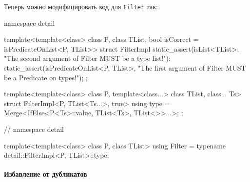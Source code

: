 Теперь можно модифицировать код для \verb"Filter" так:
\begin{cppcode}
namespace detail {
template<template<class> class P, class TList,
         bool isCorrect = isPredicateOnList<P, TList>>
struct FilterImpl {
  static_assert(isList<TList>, "The second argument of Filter MUST be a type list!");
  static_assert(isPredicateOnList<P, TList>,
                "The first argument of Filter MUST be a Predicate on types!");
};

template<template<class> class P, template<class...> class TList, class... Ts>
struct FilterImpl<P, TList<Ts...>, true> {
  using type = Merge<IfElse<P<Ts>::value, TList<Ts>, TList<>>...>;
};

} // namespace detail

template<template<class> class P, class TList>
using Filter = typename detail::FilterImpl<P, TList>::type;
\end{cppcode}

\paragraph{Избавление от дубликатов}

